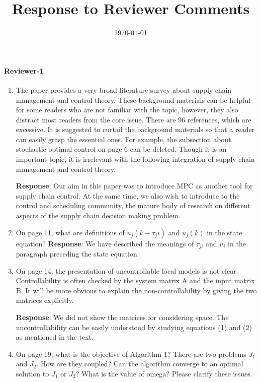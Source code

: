 \documentclass{article}
\title{Response to Reviewer Comments}
\date{\today}
\newcommand{\response}[1]{\textbf{Response}: #1}
\begin{document}
\maketitle

\paragraph{Reviewer-1}

\begin{enumerate}
\item  The paper provides a very broad literature survey about supply chain management and control theory. These background materials can be helpful for some readers who are not familiar with the topic, however, they also distract most readers from the core issue. There are 96 references, which are excessive. It is suggested to curtail the background materials so that a reader can easily grasp the essential ones. For example, the subsection about stochastic optimal control on page 6 can be deleted. Though it is an important topic, it is irrelevant with the following integration of supply chain management and control theory.

\response{Our aim in this paper was to introduce MPC as another tool for supply chain control. At the same time, we also wish to introduce to the control and scheduling community, the mature body of research on different aspects of the supply chain decision making problem.} 


\item On page 11, what are definitions of $u_j(k-\tau_ji)$ and $u_j(k)$ in the state equation?
\response{We have described the meanings of $\tau_{ji}$ and $u_i$ in the paragraph preceding the state equation.}

\item On page 14, the presentation of uncontrollable local models is not clear. Controllability is often checked by the system matrix A and the input matrix B. It will be more obvious to explain the non-controllability by giving the two matrices explicitly.

\response{We did not show the matrices for considering space.  The
  uncontrollability can be easily understood by studying equations (1)
  and (2) as mentioned in the text.}

\item On page 19, what is the objective of Algorithm 1? There are two
  problems $J_1$ and $J_2$. How are they coupled? Can the algorithm
  converge to an optimal solution to $J_1$ or $J_2$? What is the value of
  omega? Please clarify these issues.


\end{enumerate}
\end{document}
